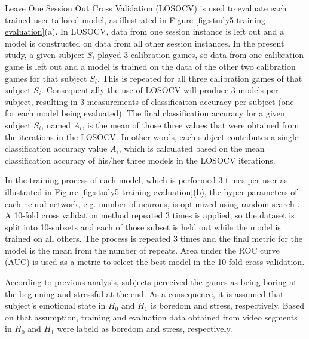 Leave One Session Out Cross Validation (LOSOCV) is used to evaluate each trained user-tailored model, as illustrated in Figure \ref{fig:study5-training-evaluation}(a). In LOSOCV, data from one session instance is left out and a model is constructed on data from all other session instances. In the present study, a given subject $S_i$ played 3 calibration games, so data from one calibration game is left out and a model is trained on the data of the other two calibration games for that subject $S_i$. This is repeated for all three calibration games of that subject $S_i$. Consequentially the use of LOSOCV will produce 3 models per subject, resulting in 3 measurements of classificaiton accuracy per subject (one for each model being evaluated). The final classification accuracy for a given subject $S_i$, named $A_i$, is the mean of those three values that were obtained from the iterations in the LOSOCV. In other words, each subject contributes a single classification accuracy value $A_i$, which is calculated based on the mean classification accuracy of his/her three models in the LOSOCV iterations.

In the training process of each model, which is performed 3 times per user as illustrated in Figure \ref{fig:study5-training-evaluation}(b), the hyper-parameters of each neural network, e.g. number of neurons, is optimized using random search \parencite{bergstra2012random}. A 10-fold cross validation method repeated 3 times is applied, so the dataset is split into 10-subsets and each of those subset is held out while the model is trained on all others. The process is repeated 3 times and the final metric for the model is the mean from the number of repeats. Area under the ROC curve (AUC) is used as a metric to select the best model in the 10-fold cross validation.

According to previous analysis, subjects perceived the games as being boring at the beginning and stressful at the end. As a consequence, it is assumed that subject's emotional state in $H_0$ and $H_1$ is boredom and stress, respectively. Based on that assumption, training and evaluation data obtained from video segments in $H_0$ and $H_1$ were labeld as boredom and stress, respectively.



